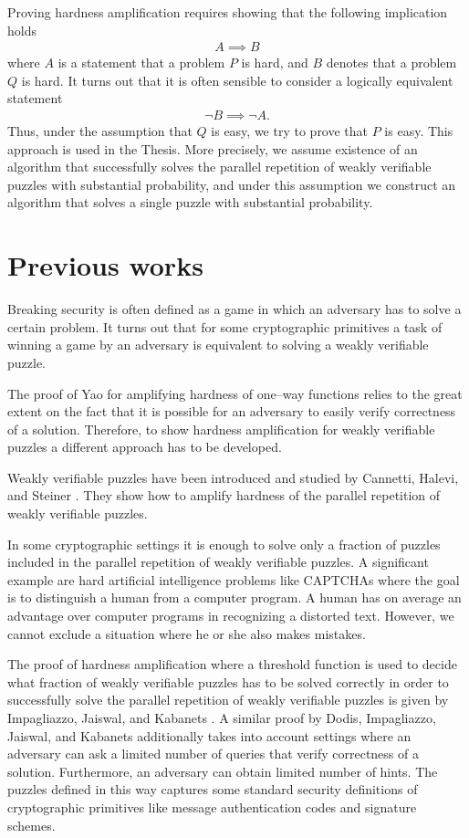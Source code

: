 Proving hardness amplification requires showing that the following implication holds
\begin{align*}
  A \implies B
\end{align*}
where $A$ is a statement that a problem $P$ is hard, and $B$ denotes that a problem $Q$ is hard.
It turns out that it is often sensible to consider a logically equivalent statement
\begin{align*}
  \lnot B \implies \lnot A.
\end{align*}
Thus, under the assumption that $Q$ is easy, we try to prove that $P$ is easy.
This approach is used in the Thesis. More precisely, we assume existence of an algorithm that successfully
solves the parallel repetition of weakly verifiable puzzles with substantial probability, and
under this assumption we construct an algorithm that solves a single puzzle with substantial probability.

\section{Previous works}
Breaking security is often defined as a game in which an adversary has to solve a certain problem.
It turns out that for some cryptographic primitives a task of winning a game by an adversary
is equivalent to solving a weakly verifiable puzzle.

The proof of Yao for amplifying hardness of one--way functions relies to the great extent on the fact that it is possible
for an adversary to easily verify correctness of a solution. Therefore, to show hardness amplification
for weakly verifiable puzzles a different approach has to be developed.

Weakly verifiable puzzles have been introduced and studied by Cannetti, Halevi, and Steiner \cite{canetti2004hardness}.
They show how to amplify hardness of the parallel repetition of weakly verifiable puzzles.

In some cryptographic settings it is enough to solve only a fraction of puzzles included in the parallel repetition of weakly verifiable puzzles.
A significant example are hard artificial intelligence problems like CAPTCHAs where the goal is to distinguish a human from a computer program.
A human has on average an advantage over computer programs in recognizing a distorted text. However, we cannot exclude a situation where he or she also makes mistakes.

The proof of hardness amplification where a threshold function is used to decide what fraction of weakly verifiable puzzles has to be solved correctly
in order to successfully solve the parallel repetition of weakly verifiable puzzles is given by Impagliazzo, Jaiswal, and Kabanets \cite{impagliazzo2007chernoff}.
A similar proof by Dodis, Impagliazzo, Jaiswal, and Kabanets \cite{Dodis:2009:SAI:1530441.1530450} additionally
takes into account settings where an adversary can ask a limited number of queries that verify correctness of a solution.
Furthermore, an adversary can obtain limited number of hints. The puzzles defined in this way captures
some standard security definitions of cryptographic primitives like message authentication codes and signature schemes.

